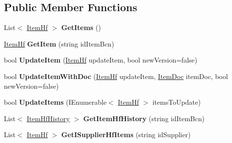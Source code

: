 \subsection*{Public Member Functions}
\begin{DoxyCompactItemize}
\item 
\mbox{\label{interface_h_k_supply_1_1_services_1_1_interfaces_1_1_i_item_hf_af440feba69dc66cbf9c25a2db0018214}} 
List$<$ \mbox{\hyperlink{class_h_k_supply_1_1_models_1_1_item_hf}{Item\+Hf}} $>$ {\bfseries Get\+Items} ()
\item 
\mbox{\label{interface_h_k_supply_1_1_services_1_1_interfaces_1_1_i_item_hf_a458b5182410a12747cbbd80900cee18d}} 
\mbox{\hyperlink{class_h_k_supply_1_1_models_1_1_item_hf}{Item\+Hf}} {\bfseries Get\+Item} (string id\+Item\+Bcn)
\item 
\mbox{\label{interface_h_k_supply_1_1_services_1_1_interfaces_1_1_i_item_hf_abf94057ba92f89effa5b5b2215ac8889}} 
bool {\bfseries Update\+Item} (\mbox{\hyperlink{class_h_k_supply_1_1_models_1_1_item_hf}{Item\+Hf}} update\+Item, bool new\+Version=false)
\item 
\mbox{\label{interface_h_k_supply_1_1_services_1_1_interfaces_1_1_i_item_hf_a8072dae9f707c9fe372e06f0902fa665}} 
bool {\bfseries Update\+Item\+With\+Doc} (\mbox{\hyperlink{class_h_k_supply_1_1_models_1_1_item_hf}{Item\+Hf}} update\+Item, \mbox{\hyperlink{class_h_k_supply_1_1_models_1_1_item_doc}{Item\+Doc}} item\+Doc, bool new\+Version=false)
\item 
\mbox{\label{interface_h_k_supply_1_1_services_1_1_interfaces_1_1_i_item_hf_a3b14e3dd45854e82a7f98f7d451bb5eb}} 
bool {\bfseries Update\+Items} (I\+Enumerable$<$ \mbox{\hyperlink{class_h_k_supply_1_1_models_1_1_item_hf}{Item\+Hf}} $>$ items\+To\+Update)
\item 
\mbox{\label{interface_h_k_supply_1_1_services_1_1_interfaces_1_1_i_item_hf_a0a8aba5283006eeff141d15494e1173a}} 
List$<$ \mbox{\hyperlink{class_h_k_supply_1_1_models_1_1_item_hf_history}{Item\+Hf\+History}} $>$ {\bfseries Get\+Item\+Hf\+History} (string id\+Item\+Bcn)
\item 
\mbox{\label{interface_h_k_supply_1_1_services_1_1_interfaces_1_1_i_item_hf_ad166151446ac3fc70a58a3b5eee0457c}} 
List$<$ \mbox{\hyperlink{class_h_k_supply_1_1_models_1_1_item_hf}{Item\+Hf}} $>$ {\bfseries Get\+I\+Supplier\+Hf\+Items} (string id\+Supplier)
\end{DoxyCompactItemize}


